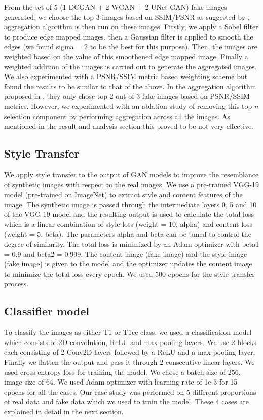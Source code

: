 \documentclass[10pt,journal,compsoc]{IEEEtran}
\begin{document}
From the set of 5 (1 DCGAN + 2 WGAN + 2 UNet GAN) fake images generated, we choose the top 3 images based on SSIM/PSNR as suggested by \cite{Mukherkjee2022}, aggregation
algorithm is then run on these images. Firstly, we apply a Sobel filter to produce edge mapped images, then a Gaussian filter is applied to smooth the edges (we found
sigma = 2 to be the best for this purpose). Then, the images are weighted based on the value of this smoothened edge mapped image. Finally a weighted addition of the images
is carried out to generate the aggregated images. We also experimented with a PSNR/SSIM metric based weighting scheme but found the results to be similar to that of the
above. In the aggregation algorithm proposed in \cite{Mukherkjee2022}, they only chose top 2 out of 3 fake images based on PSNR/SSIM metrics. However, we experimented with 
an ablation study of removing this top $n$ selection component by performing aggregation across all the images. As mentioned in the result and analysis section this proved to be not very effective.

\subsection{Style Transfer}

We apply style transfer to the output of GAN models to improve the resemblance of synthetic images with respect to the real images. We use a pre-trained VGG-19 model (pre-trained on ImageNet) to extract style and content features of the image. The synthetic image is passed through the intermediate layers 0, 5 and 10 of the VGG-19 model and the resulting output is used to calculate the total loss which is a linear combination of style loss (weight = 10, alpha) and content loss (weight = 5, beta). The parameters alpha and beta can be tuned to control the degree of similarity. The total loss is minimized by an Adam optimizer with beta1 = 0.9 and beta2 = 0.999. The content image (fake image) and the style image (fake image) is given to the model and the optimizer updates the content image to minimize the total loss every epoch. We used 500 epochs for the style transfer process. 

\subsection{Classifier model}

To classify the images as either T1 or T1ce class, we used a classification model which
consists of 2D convolution, ReLU and max pooling layers. We use 2 blocks each consisting of 2 Conv2D layers followed by a ReLU and a max pooling layer. Finally we flatten the output and pass it through 2 consecutive linear layers. We used cross entropy loss for training the model. We chose a batch size of 256, image size of 64. We used Adam optimizer with learning rate of 1e-3 for 15 epochs for all the cases. Our case study was performed on 5 different proportions of real data and fake data which we used to train the model. These
4 cases are explained in detail in the next section.
\end{document}
